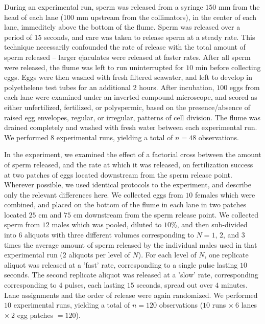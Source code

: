 \documentclass{article}
\begin{document}
	During an experimental run, sperm was released from a syringe $150$ mm from the head of each lane ($100$ mm upstream from the collimators), in the center of each lane, immeditely above the bottom of the flume. Sperm was released over a period of $15$ seconds, and care was taken to release sperm at a steady rate. This technique necessarily confounded the rate of release with the total amount of sperm released -- larger ejaculates were released at faster rates. After all sperm were released, the flume was left to run uninterrupted for $10$ min before collecting eggs. Eggs were then washed with fresh filtered seawater, and left to develop in polyethelene test tubes for an additional $2$ hours. After incubation, $100$ eggs from each lane were examined under an inverted compound microscope, and scored as either unfertilized, fertilized, or polyspermic, based on the presence/absence of raised egg envelopes, regular, or irregular, patterns of cell division. The flume was drained completely and washed with fresh water between each experimental run. We performed $8$ experimental runs, yielding a total of $n=48$ observations.

	In the  experiment, we examined the effect of a factorial cross between the amount of sperm released, and the rate at which it was released, on fertilization success at two patches of eggs located downstream from the sperm release point. Wherever possible, we used identical protocols to the  experiment, and describe only the relevant differences here. We collected eggs from $10$ females which were combined, and placed on the bottom of the flume in each lane in two patches located $25$ cm and $75$ cm downstream from the sperm release point. We collected sperm from $12$ males which was pooled, diluted to $10$\%, and then sub-divided into $6$ aliquots with three different volumes corresponding to $N = 1$, $2$, and $3$ times the average amount of sperm released by the individual males used in that experimental run ($2$ aliquots per level of $N$). For each level of $N$, one replicate aliquot was released at a 'fast' rate, corresponding to a single pulse lasting $10$ seconds. The second replicate aliquot was released at a 'slow' rate, corresponding corresponding to $4$ pulses, each lasting $15$ seconds, spread out over $4$ minutes. Lane assignments and the order of release were again randomized. We performed $10$ experimental runs, yielding a total of $n=120$ observations ($10$ runs $\times~6$ lanes $\times~2$ egg patches $= 120$).
\end{document}
